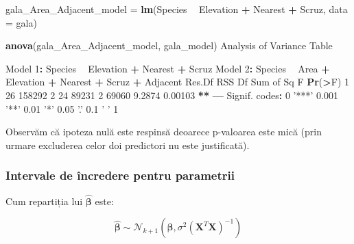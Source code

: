 \documentclass[]{article}
\newenvironment{Shaded}{\begin{snugshade}}{\end{snugshade}}
\newcommand{\KeywordTok}[1]{\textcolor[rgb]{0.13,0.29,0.53}{\textbf{#1}}}
\newcommand{\DataTypeTok}[1]{\textcolor[rgb]{0.13,0.29,0.53}{#1}}
\newcommand{\DecValTok}[1]{\textcolor[rgb]{0.00,0.00,0.81}{#1}}
\newcommand{\FloatTok}[1]{\textcolor[rgb]{0.00,0.00,0.81}{#1}}
\newcommand{\StringTok}[1]{\textcolor[rgb]{0.31,0.60,0.02}{#1}}
\newcommand{\OperatorTok}[1]{\textcolor[rgb]{0.81,0.36,0.00}{\textbf{#1}}}
\newcommand{\NormalTok}[1]{#1}
\begin{document}
\begin{Shaded}
\begin{Highlighting}[]
\NormalTok{gala_Area_Adjacent_model =}\StringTok{ }\KeywordTok{lm}\NormalTok{(Species }\OperatorTok{~}\StringTok{ }\NormalTok{Elevation }\OperatorTok{+}\StringTok{ }\NormalTok{Nearest }\OperatorTok{+}\StringTok{ }\NormalTok{Scruz, }
    \DataTypeTok{data =}\NormalTok{ gala)}

\KeywordTok{anova}\NormalTok{(gala_Area_Adjacent_model, gala_model)}
\NormalTok{Analysis of Variance Table}

\NormalTok{Model }\DecValTok{1}\OperatorTok{:}\StringTok{ }\NormalTok{Species }\OperatorTok{~}\StringTok{ }\NormalTok{Elevation }\OperatorTok{+}\StringTok{ }\NormalTok{Nearest }\OperatorTok{+}\StringTok{ }\NormalTok{Scruz}
\NormalTok{Model }\DecValTok{2}\OperatorTok{:}\StringTok{ }\NormalTok{Species }\OperatorTok{~}\StringTok{ }\NormalTok{Area }\OperatorTok{+}\StringTok{ }\NormalTok{Elevation }\OperatorTok{+}\StringTok{ }\NormalTok{Nearest }\OperatorTok{+}\StringTok{ }\NormalTok{Scruz }\OperatorTok{+}\StringTok{ }\NormalTok{Adjacent}
\NormalTok{  Res.Df    RSS Df Sum of Sq      F  }\KeywordTok{Pr}\NormalTok{(}\OperatorTok{>}\NormalTok{F)   }
\DecValTok{1}     \DecValTok{26} \DecValTok{158292}                               
\DecValTok{2}     \DecValTok{24}  \DecValTok{89231}  \DecValTok{2}     \DecValTok{69060} \FloatTok{9.2874} \FloatTok{0.00103} \OperatorTok{**}
\OperatorTok{---}
\NormalTok{Signif. codes}\OperatorTok{:}\StringTok{  }\DecValTok{0} \StringTok{'***'} \FloatTok{0.001} \StringTok{'**'} \FloatTok{0.01} \StringTok{'*'} \FloatTok{0.05} \StringTok{'.'} \FloatTok{0.1} \StringTok{' '} \DecValTok{1}
\end{Highlighting}
\end{Shaded}

Observăm că ipoteza nulă este respinsă deoarece p-valoarea este mică
(prin urmare excluderea celor doi predictori nu este justificată).

\subsubsection{Intervale de încredere pentru
parametrii}\label{intervale-de-incredere-pentru-parametrii-1}

Cum repartiția lui \(\hat{\boldsymbol{\beta}}\) este:

\[
\hat{\boldsymbol{\beta}}\sim\mathcal{N}_{k+1}\left(\boldsymbol\beta,\sigma^2(\mathbf{X}^T\mathbf{X})^{-1}\right)
\]
\end{document}
